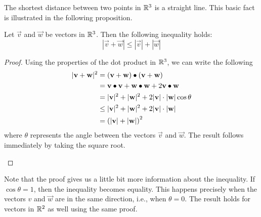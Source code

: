 \documentclass[handout]{ximera}
\begin{document}
The shortest distance between two points in $\mathbb R^3$ is a straight line.  This basic fact is illustrated in the following proposition.

\begin{proposition}
Let $\vec{v}$ and $\vec{w}$ be vectors in $\mathbb R^3$. Then the following inequality holds:
\[
|\vec{v} + \vec{w}| \leq |\vec{v}| +|\vec{w}| 
\]



\begin{proof}
Using the properties of the dot product in $\mathbb R^3$, we can write the following
\begin{align*}
|\mathbf{v} + \mathbf{w}|^2 &= \left(\mathbf{v} + \mathbf{w}\right) \bullet \left(\mathbf{v} + \mathbf{w}\right)\\
                        &= \mathbf{v} \bullet \mathbf{v} + \mathbf{w}\bullet \mathbf{w} + 2\mathbf{v} \bullet \mathbf{w}\\
                        &= |\mathbf{v}|^2 +|\mathbf{w}|^2 + 2|\mathbf{v}|\cdot |\mathbf{w}| \cos \theta\\
                        &\leq |\mathbf{v}|^2 +|\mathbf{w}|^2 + 2|\mathbf{v}|\cdot |\mathbf{w}|\\
                        &= \left(|\mathbf{v}| + |\mathbf{w}|\right)^2
\end{align*}
where $\theta$ represents the angle between the vectors $\vec{v}$ and $\vec{w}$.  The result follows immediately by taking the square root.
          
\begin{image}
\end{image}

              
\end{proof}

\end{proposition}

Note that the proof gives us a little bit more information about the inequality. If $\cos \theta = 1$, then the inequality becomes equality.  This happens precisely 
when the vectors ${v}$ and $\vec{w}$ are in the same direction, i.e., when $\theta = 0$. The result holds for vectors in $\mathbb R^2$ as well using the same proof.
\end{document}
